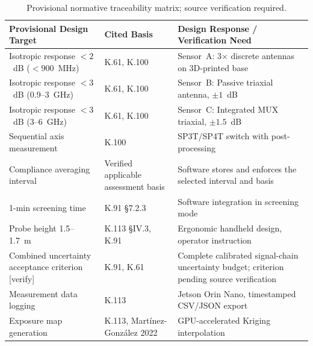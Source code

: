 \documentclass[11pt,a4paper]{article}
\begin{document}
\begin{table}[ht]
\centering
\caption{Provisional normative traceability matrix; source verification required.}
\label{tab:compliance_matrix}
\small
\begin{tabular}{L{3.5cm} L{3.0cm} L{5.5cm}}
\toprule
\textbf{Provisional Design Target} & \textbf{Cited Basis} & \textbf{Design Response / Verification Need} \\
\midrule
Isotropic response $< 2$~dB ($< 900$~MHz) & K.61, K.100 & Sensor~A: 3$\times$ discrete antennas on 3D-printed base \\
Isotropic response $< 3$~dB (0.9--3~GHz) & K.61, K.100 & Sensor~B: Passive triaxial antenna, $\pm 1$~dB \\
Isotropic response $< 3$~dB (3--6~GHz) & K.61, K.100 & Sensor~C: Integrated MUX triaxial, $\pm 1.5$~dB \\
Sequential axis measurement & K.100 & SP3T/SP4T switch with post-processing \\
Compliance averaging interval & Verified applicable assessment basis & Software stores and enforces the selected interval and basis \\
1-min screening time & K.91 \S7.2.3 & Software integration in screening mode \\
Probe height 1.5--1.7~m & K.113 \S IV.3, K.91 & Ergonomic handheld design, operator instruction \\
Combined uncertainty acceptance criterion [verify] & K.91, K.61 & Complete calibrated signal-chain uncertainty budget; criterion pending source verification \\
Measurement data logging & K.113 & Jetson Orin Nano, timestamped CSV/JSON export \\
Exposure map generation & K.113, Mart\'{i}nez-Gonz\'{a}lez 2022 & GPU-accelerated Kriging interpolation \\
\bottomrule
\end{tabular}
\end{table}


\newpage
\nocite{mintic_dec1370_2018, ane_res773_2023, icnirp2020, itut_k52, itut_k61, itut_k91, itut_k100, itut_k113, martinezgonzalez_2022}

\end{document}
